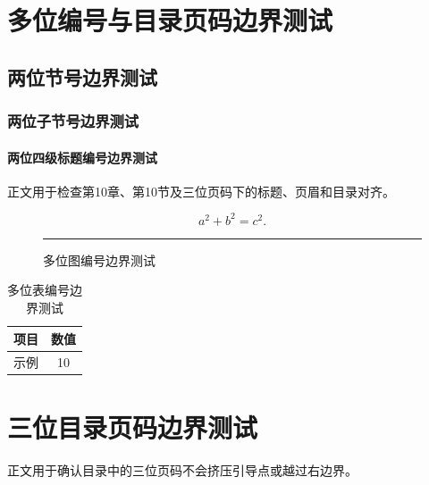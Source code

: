 \documentclass[tocdepth3]{uestcthesis}
\providecommand{\BoundaryChapterTenTitle}{多位编号与目录页码边界测试}
\providecommand{\BoundarySectionTitle}{两位节号边界测试}
\providecommand{\BoundarySubsectionTitle}{两位子节号边界测试}
\providecommand{\BoundarySubsubsectionTitle}{两位四级标题编号边界测试}
\providecommand{\BoundaryBodyText}{正文用于检查第10章、第10节及三位页码下的标题、页眉和目录对齐。}
\providecommand{\BoundaryFigureTitle}{多位图编号边界测试}
\providecommand{\BoundaryTableTitle}{多位表编号边界测试}
\providecommand{\BoundaryItem}{项目}
\providecommand{\BoundaryValue}{数值}
\providecommand{\BoundaryExample}{示例}
\providecommand{\BoundaryChapterElevenTitle}{三位目录页码边界测试}
\providecommand{\BoundaryFinalText}{正文用于确认目录中的三位页码不会挤压引导点或越过右边界。}
\begin{document}
\uestcfrontmatter
\uestctableofcontents

\uestcmainmatter
\setcounter{page}{99}
\setcounter{chapter}{9}
\chapter{\BoundaryChapterTenTitle}

\setcounter{section}{9}
\section{\BoundarySectionTitle}
\setcounter{subsection}{9}
\subsection{\BoundarySubsectionTitle}
\setcounter{subsubsection}{9}
\subsubsection{\BoundarySubsubsectionTitle}

\BoundaryBodyText

\setcounter{equation}{9}
\begin{equation}
    a^2+b^2=c^2.
\end{equation}

\setcounter{figure}{9}
\begin{figure}[htbp]
    \centering
    \rule{6cm}{2cm}
    \caption{\BoundaryFigureTitle}
\end{figure}

\setcounter{table}{9}
\begin{table}[htbp]
    \centering
    \caption{\BoundaryTableTitle}
    \begin{tabular}{lc}
        \toprule
        \BoundaryItem & \BoundaryValue \\
        \midrule
        \BoundaryExample & 10 \\
        \bottomrule
    \end{tabular}
\end{table}

\clearpage
\chapter{\BoundaryChapterElevenTitle}
\BoundaryFinalText
\end{document}

